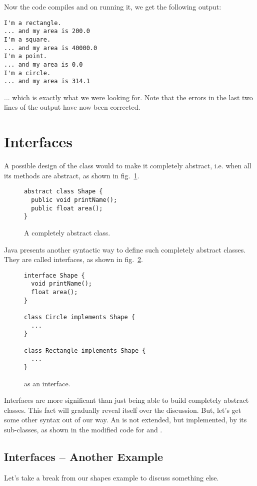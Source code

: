 \documentclass[12pt,a4paper]{article}
\begin{document}
Now the code compiles and on running it, we get the following output:
\begin{lstlisting}[frame=single]
I'm a rectangle.
... and my area is 200.0
I'm a square.
... and my area is 40000.0
I'm a point.
... and my area is 0.0
I'm a circle.
... and my area is 314.1
\end{lstlisting}

... which is exactly what we were looking for. Note that the errors in the last two lines of the output have now been corrected.

\section{Interfaces}
A possible design of the \lstinline@Shape@ class would to make it completely abstract, i.e. when all its methods are abstract, as shown in fig.~\ref{f:sh3}.
\begin{figure}[H]
\begin{lstlisting}[frame=single]
abstract class Shape {
  public void printName();
  public float area();
}
\end{lstlisting}
\caption{A completely abstract \lstinline@Shape@ class.}
\label{f:sh3}
\end{figure}

Java presents another syntactic way to define such completely abstract classes. They are called interfaces, as shown in fig.~\ref{f:sh4}.
\begin{figure}[H]
\begin{lstlisting}[frame=single]
interface Shape {
  void printName();
  float area();
}

class Circle implements Shape {
  ...
}

class Rectangle implements Shape {
  ...
}
\end{lstlisting}
\caption{\lstinline@Shape@ as an interface.}
\label{f:sh4}
\end{figure}

Interfaces are more significant than just being able to build completely abstract classes. This fact will gradually reveal itself over the discussion. But, let's get some other syntax out of our way. An \lstinline@interface@ is not extended, but implemented, by its sub-classes, as shown in the modified code for \lstinline@Circle@ and \lstinline@Rectangle@.

\subsection{Interfaces -- Another Example}
Let's take a break from our shapes example to discuss something else.
\end{document}

